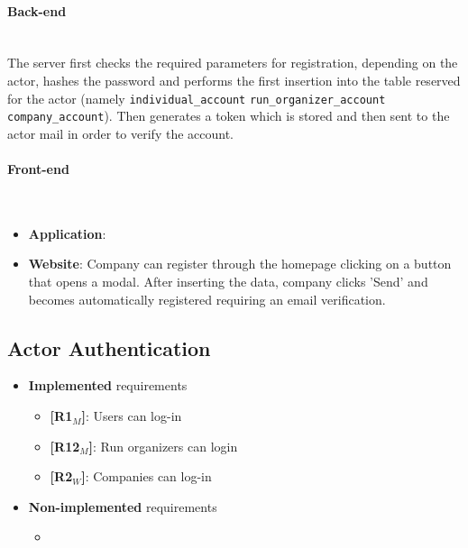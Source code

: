 \paragraph{Back-end} \mbox{}\\ 
The server first checks the required parameters for registration, depending on the actor, hashes the password and performs the first insertion into the table reserved for the actor (namely \texttt{individual\_account} \texttt{run\_organizer\_account} \texttt{company\_account}). Then generates a token which is stored and then sent to the actor mail in order to verify the account.
\paragraph{Front-end} \mbox{}\\

\begin{itemize}
    \item \textbf{Application}: 
    \item \textbf{Website}: Company can register through the homepage clicking on a button that opens a modal. After inserting the data, company clicks 'Send' and becomes automatically registered requiring an email verification.
\end{itemize}


\subsection{Actor Authentication}
\begin{itemize}
    \item \textbf{Implemented} requirements
        \begin{itemize}
    \item \textbf{[R1$_M$]}: Users can log-in
    
    \item \textbf{[R12$_M$]}: Run organizers can login
    
    \item \textbf{[R2$_W$]}: Companies can log-in


        \end{itemize}
    \item \textbf{Non-implemented} requirements
    \begin{itemize}
            \item 
        \end{itemize}
\end{itemize}

